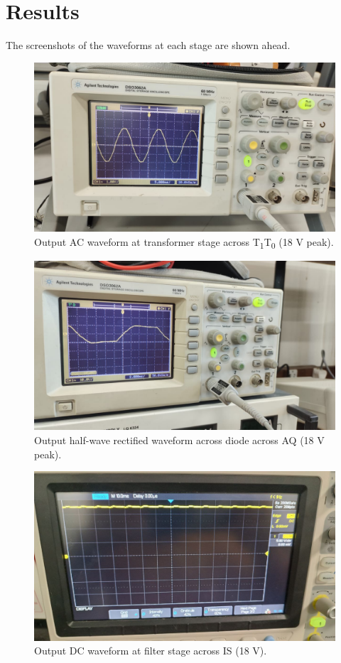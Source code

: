 \documentclass[journal,12pt,twocolumn]{IEEEtran}
\begin{document}
\section{Results}
The screenshots of the waveforms at each stage are shown ahead.
\begin{figure}[!ht]
    \includegraphics[width=\columnwidth]{figs/figure_1.jpeg}
    \caption{Output AC waveform at transformer stage across T\textsubscript{1}T\textsubscript{0} (18 V peak).}
    \label{fig:transformer}
\end{figure}
\begin{figure}[!ht]
    \includegraphics[width=\columnwidth]{figs/figure_2.jpeg}
    \caption{Output half-wave rectified waveform across diode across AQ (18 V peak).}
    \label{fig:rectifier}
\end{figure}
\begin{figure}[!ht]
    \includegraphics[width=\columnwidth]{figs/figure3.jpg}
    \caption{Output DC waveform at filter stage across IS (18 V).}
    \label{fig:filter}
\end{figure}
\end{document}
